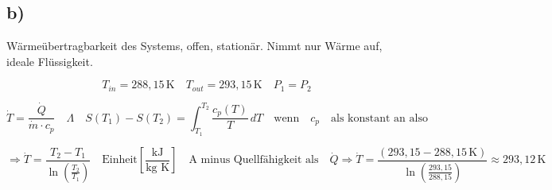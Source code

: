 

\subsection*{b)}

Wärmeübertragbarkeit des Systems, offen, stationär. Nimmt nur Wärme auf, ideale Flüssigkeit.

\[
T_{in} = 288,15 \, \text{K} \quad T_{out} = 293,15 \, \text{K} \quad P_1 = P_2
\]

\[
\dot{T} = \frac{\dot{Q}}{\dot{m} \cdot c_p} \quad \Lambda \quad S(T_1) - S(T_2) = \int_{T_1}^{T_2} \frac{c_p(T)}{T} \, dT \quad \text{wenn} \quad c_p \quad \text{als konstant an also}
\]

\[
\Rightarrow \dot{T} = \frac{T_2 - T_1}{\ln \left( \frac{T_2}{T_1} \right)} \quad \text{Einheit} \left[ \frac{\text{kJ}}{\text{kg K}} \right] \quad \text{A minus Quellfähigkeit als} \quad \dot{Q} \Rightarrow \dot{T} = \frac{(293,15 - 288,15 \, \text{K})}{\ln \left( \frac{293,15}{288,15} \right)} \approx 293,12 \, \text{K}
\]